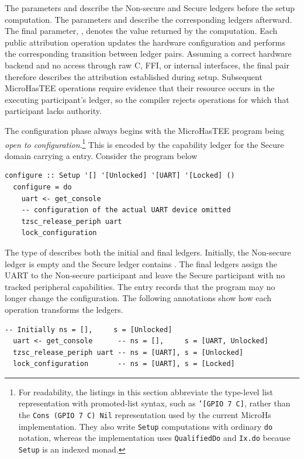\documentclass[sigconf]{acmart}
\begin{document}
The parameters  and  describe the Non-secure and Secure ledgers before the setup computation.
The parameters  and  describe the corresponding ledgers afterward.
The final parameter, , denotes the value returned by the computation.
Each public attribution operation updates the hardware configuration and performs the corresponding transition between ledger pairs.
Assuming a correct hardware backend and no access through raw C, FFI, or internal interfaces, the final pair therefore describes the attribution established during setup.
Subsequent MicroHasTEE operations require evidence that their resource occurs in the executing participant's ledger, so the compiler rejects operations for which that participant lacks authority.

The configuration phase always begins with the MicroHasTEE program being \textit{open to configuration}.\footnote{
For readability, the listings in this section abbreviate the type-level list representation with promoted-list syntax, such as \texttt{'[GPIO 7 C]}, rather than the \texttt{Cons (GPIO 7 C) Nil} representation used by the current MicroHs implementation.
They also write \texttt{Setup} computations with ordinary \texttt{do} notation, whereas the implementation uses \texttt{QualifiedDo} and \texttt{Ix.do} because \texttt{Setup} is an indexed monad.}
This is encoded by the capability ledger for the Secure domain carrying a  entry.
Consider the program below

\begin{lstlisting}[style=haskell]
  configure :: Setup '[] '[Unlocked] '[UART] '[Locked] ()
  configure = do
    uart <- get_console
    -- configuration of the actual UART device omitted
    tzsc_release_periph uart
    lock_configuration
\end{lstlisting}

The type of  describes both the initial and final ledgers.
Initially, the Non-secure ledger is empty and the Secure ledger contains .
The final ledgers assign the UART to the Non-secure participant and leave the Secure participant with no tracked peripheral capabilities.
The  entry records that the program may no longer change the configuration.
The following annotations show how each operation transforms the ledgers.

\begin{lstlisting}[style=haskell]
                 -- Initially ns = [],     s = [Unlocked]
  uart <- get_console      -- ns = [],     s = [UART, Unlocked]
  tzsc_release_periph uart -- ns = [UART], s = [Unlocked]
  lock_configuration       -- ns = [UART], s = [Locked]
\end{lstlisting}
\end{document}
